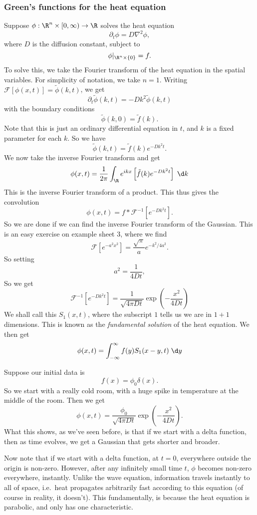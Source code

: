 \documentclass[a4paper]{article}
\begin{document}
\subsubsection*{Green's functions for the heat equation}
Suppose $\phi: \R^n \times [0, \infty) \to \R$ solves the heat equation
\[
  \partial_t \phi = D \nabla^2 \phi,
\]
where $D$ is the diffusion constant, subject to
\[
  \phi|_{\R^n \times \{0\}} = f.
\]
To solve this, we take the Fourier transform of the heat equation in the spatial variables. For simplicity of notation, we take $n = 1$. Writing $\mathcal{F}[\phi(x, t)] = \tilde{\phi}(k, t)$, we get
\[
  \partial_t \tilde{\phi}(k ,t) = -D k^2 \tilde{\phi}(k, t)
\]
with the boundary conditions
\[
  \tilde{\phi}(k, 0) = \tilde{f}(k).
\]
Note that this is just an ordinary differential equation in $t$, and $k$ is a fixed parameter for each $k$. So we have
\[
  \tilde{\phi}(k, t) = \tilde{f}(k) e^{-Dk^2 t}.
\]
We now take the inverse Fourier transform and get
\[
  \phi(x, t) = \frac{1}{2\pi} \int_\R e^{ikx}\left[\tilde{f}(k) e^{-D k^2 t} \right]\;\d k
\]
This is the inverse Fourier transform of a product. This thus gives the convolution
\[
  \phi(x, t) = f * \mathcal{F}^{-1}[e^{-Dk^2 t}].
\]
So we are done if we can find the inverse Fourier transform of the Gaussian. This is an easy exercise on example sheet 3, where we find
\[
  \mathcal{F}[e^{-a^2 x^2}] = \frac{\sqrt{\pi}}{a} e^{-k^2/4a^2}.
\]
So setting
\[
  a^2 = \frac{1}{4Dt},
\]
So we get
\[
  \mathcal{F}^{-1}[e^{-Dk^2 t}] = \frac{1}{\sqrt{4\pi Dt}} \exp\left(-\frac{x^2}{4Dt}\right)
\]
We shall call this $S_1(x, t)$, where the subscript $1$ tells us we are in $1 + 1$ dimensions. This is known as the \emph{fundamental solution} of the heat equation. We then get
\[
  \phi(x, t) = \int_{-\infty}^\infty f(y) S_1(x - y, t) \;\d y
\]
\begin{eg}
  Suppose our initial data is
  \[
    f(x) = \phi_0\delta(x).
  \]
  So we start with a really cold room, with a huge spike in temperature at the middle of the room. Then we get
  \[
    \phi(x, t) = \frac{\phi_0}{\sqrt{4\pi Dt}} \exp\left(-\frac{x^2}{4Dt}\right).
  \]
  What this shows, as we've seen before, is that if we start with a delta function, then as time evolves, we get a Gaussian that gets shorter and broader.

  Now note that if we start with a delta function, at $t = 0$, everywhere outside the origin is non-zero. However, after any infinitely small time $t$, $\phi$ becomes non-zero everywhere, instantly. Unlike the wave equation, information travels instantly to all of space, i.e.\ heat propagates arbitrarily fast according to this equation (of course in reality, it doesn't). This fundamentally, is because the heat equation is parabolic, and only has one characteristic.
\end{eg}
\end{document}
